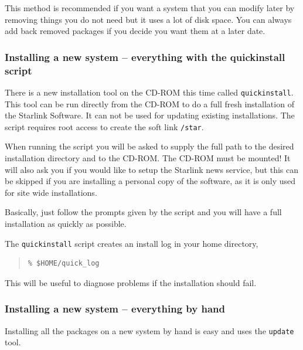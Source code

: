 \documentclass[twoside,11pt]{article}
\newcommand{\xlabel}[1]{}
\renewcommand{\_}{\texttt{\symbol{95}}}
\begin{document}
This method is recommended if you want a system that you can modify
later by removing things you do not need but it uses a lot of disk space.
You can always add back removed packages if you decide you want them at 
a later date.

\subsubsection{\xlabel{installing_a_new_system-everything_quick_install}Installing a new system -- everything
with the quick\_install script}
\label{installing_a_new_system-everything_quick_install}

There is a new installation tool on the CD-ROM this time called \texttt{quick\_install}.
This tool can be run directly from the CD-ROM to do a full fresh installation of
the Starlink Software. It can not be used for updating existing installations. 
The script requires root access to create the soft link \texttt{/star}. 

When running the script you will be asked to supply the full path to the
desired installation directory and to the CD-ROM. The CD-ROM must be mounted!
It will also ask you if you would like to setup the Starlink news service,
but this can be skipped if you are installing a personal copy of the software,
as it is only used for site wide installations.  

Basically, just follow the prompts given by the script and you will have a
full installation as quickly as possible.

The \texttt{quick\_install} script creates an install log in your home directory,

\begin{quote}
\begin{verbatim}
% $HOME/quick_log 
\end{verbatim}
\end{quote}

This will be useful to diagnose problems if the installation should fail.

\subsubsection{\xlabel{installing_a_new_system-everything_quick_install}Installing a new system -- everything
by hand}
\label{installing_a_new_system-everything_by_hand}

Installing all the packages on a new system by hand is easy and uses the 
\texttt{update} tool.
\end{document}
